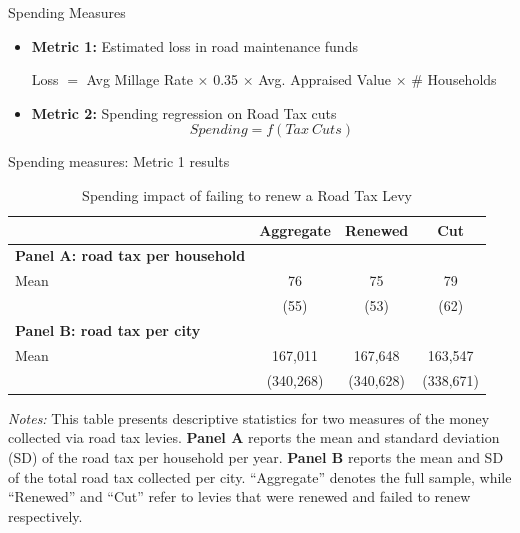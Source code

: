 \documentclass{beamer}
\begin{document}
\begin{frame}{Spending Measures}
    \begin{itemize}
        \item \textbf{Metric 1:} Estimated loss in road maintenance funds
        \vskip 0.2cm
        
         Loss $=$ Avg Millage Rate $\times$ 0.35 $\times$ Avg. Appraised Value $\times$ \# Households

         \vskip 0.5cm
        \item \textbf{Metric 2:} Spending regression on Road Tax cuts
        $$ Spending = f(Tax \ Cuts)$$
    \end{itemize}
\end{frame}

\begin{frame}{Spending measures: Metric 1 results}
    \begin{table}[ht]
        \centering
        \caption{Spending impact of failing to renew a Road Tax Levy}
        \label{tab:levy_stats}
        \begin{threeparttable}
        \begin{tabular}{p{4.5cm}ccc}
        \hline\hline
        & \textbf{Aggregate} & \textbf{Renewed} & \textbf{Cut} \\
        \hline
        \textbf{Panel A: road tax per household} \\
        Mean & 76 & 75 & 79 \\
           & (55) & (53) & (62) \\
        \hline
        \textbf{Panel B: road tax per city} \\
        Mean & 167,011 & 167,648 & 163,547 \\
           & (340,268) & (340,628) & (338,671) \\
        \hline\hline
        \end{tabular}
        \begin{tablenotes}[flushleft]
          \footnotesize
          \item \textit{Notes:} 
          This table presents descriptive statistics for two measures of the money collected via road tax levies. 
          \textbf{Panel A} reports the mean and standard deviation (SD) of the road tax per household per year. 
          \textbf{Panel B} reports the mean and SD of the total road tax collected per city. 
          “Aggregate” denotes the full sample, while “Renewed” and “Cut” refer to levies that were renewed and failed to renew respectively.
        \end{tablenotes}
        \end{threeparttable}
    \end{table}    
\end{frame}
\end{document}
